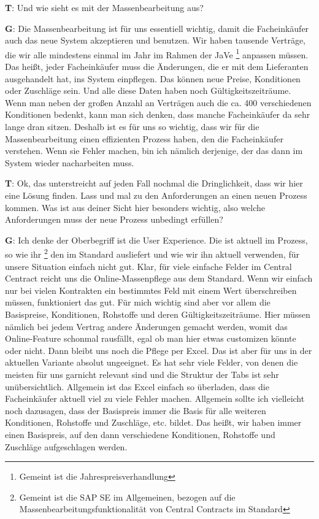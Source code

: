\begin{list}{X:}{\setlength{\labelsep}{5mm}}
 \item[\textbf{T}:] Und wie sieht es mit der Massenbearbeitung aus?
 \item[\textbf{G}:] Die Massenbearbeitung ist für uns essentiell wichtig, damit die Facheinkäufer auch das neue System akzeptieren und benutzen. Wir haben tausende Verträge, die wir alle mindestens einmal im Jahr im Rahmen der JaVe \footnote{Gemeint ist die Jahrespreisverhandlung} anpassen müssen. Das hei\ss t, jeder Facheinkäufer muss die Änderungen, die er mit dem Lieferanten ausgehandelt hat, ins System einpflegen. Das können neue Preise, Konditionen oder Zuschläge sein. Und alle diese Daten haben noch Gültigkeitszeiträume. Wenn man neben der gro\ss en Anzahl an Verträgen auch die ca. 400 verschiedenen Konditionen bedenkt, kann man sich denken, dass manche Facheinkäufer da sehr lange dran sitzen. Deshalb ist es für uns so wichtig, dass wir für die Massenbearbeitung einen effizienten Prozess haben, den die Facheinkäufer verstehen. Wenn sie Fehler machen, bin ich nämlich derjenige, der das dann im System wieder nacharbeiten muss.
 \item[\textbf{T}:] Ok, das unterstreicht auf jeden Fall nochmal die Dringlichkeit, dass wir hier eine Lösung finden. Lass und mal zu den Anforderungen an einen neuen Prozess kommen. Was ist aus deiner Sicht hier besonders wichtig, also welche Anforderungen muss der neue Prozess unbedingt erfüllen?
 \item[\textbf{G}:] Ich denke der Oberbegriff ist die User Experience. Die ist aktuell im Prozess, so wie ihr \footnote{Gemeint ist die SAP SE im Allgemeinen, bezogen auf die Massenbearbeitungsfunktionalität von Central Contracts im Standard} den im Standard ausliefert und wie wir ihn aktuell verwenden, für unsere Situation einfach nicht gut. Klar, für viele einfache Felder im Central Centract reicht uns die Online-Massenpflege aus dem Standard. Wenn wir einfach nur bei vielen Kontrakten ein bestimmtes Feld mit einem Wert überschreiben müssen, funktioniert das gut. Für mich wichtig sind aber vor allem die Basispreise, Konditionen, Rohstoffe und deren Gültigkeitszeiträume. Hier müssen nämlich bei jedem Vertrag andere Änderungen gemacht werden, womit das Online-Feature schonmal rausfällt, egal ob man hier etwas customizen könnte oder nicht. Dann bleibt uns noch die Pflege per Excel. Das ist aber für uns in der aktuellen Variante absolut ungeeignet. Es hat sehr viele Felder, von denen die meisten für uns garnicht relevant sind und die Struktur der Tabs ist sehr unübersichtlich. Allgemein ist das Excel einfach so überladen, dass die Facheinkäufer aktuell viel zu viele Fehler machen. Allgemein sollte ich vielleicht noch dazusagen, dass der Basispreis immer die Basis für alle weiteren Konditionen, Rohstoffe und Zuschläge, etc. bildet. Das hei\ss t, wir haben immer einen Basispreis, auf den dann verschiedene Konditionen, Rohstoffe und Zuschläge aufgeschlagen werden.

\end{list}
